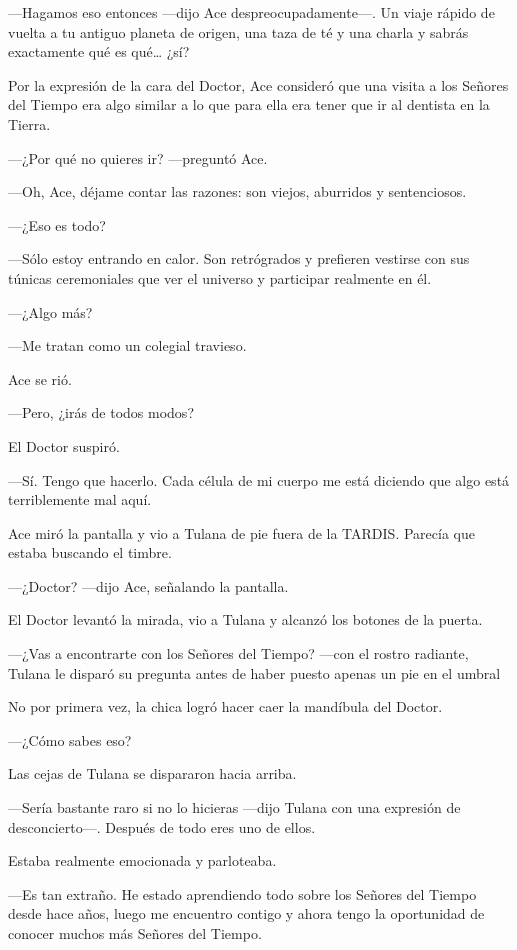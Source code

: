 ---Hagamos eso entonces ---dijo Ace despreocupadamente---. Un
viaje rápido de vuelta a tu antiguo planeta de origen, una taza de té y
una charla y sabrás exactamente qué es qué\ldots{} ¿sí?

Por la expresión de la cara del Doctor, Ace consideró que una
visita a los Señores del Tiempo era algo similar a lo que para ella era
tener que ir al dentista en la Tierra.

---¿Por qué no quieres ir? ---preguntó Ace.

---Oh, Ace, déjame contar las razones: son viejos, aburridos y
sentenciosos.

---¿Eso es todo?

---Sólo estoy entrando en calor. Son retrógrados y prefieren
vestirse con sus túnicas ceremoniales que ver el universo y participar
realmente en él.

---¿Algo más?

---Me tratan como un colegial travieso.

Ace se rió.

---Pero, ¿irás de todos modos?

El Doctor suspiró.

---Sí. Tengo que hacerlo. Cada célula de mi cuerpo me está
diciendo que algo está terriblemente mal aquí.

Ace miró la pantalla y vio a Tulana de pie fuera de la TARDIS.
Parecía que estaba buscando el timbre.

---¿Doctor? ---dijo Ace, señalando la pantalla.

El Doctor levantó la mirada, vio a Tulana y alcanzó los botones
de la puerta.

---¿Vas a encontrarte con los Señores del Tiempo? ---con el
rostro radiante, Tulana le disparó su pregunta antes de haber puesto
apenas un pie en el umbral

No por primera vez, la chica logró hacer caer la mandíbula del
Doctor.

---¿Cómo sabes eso?

Las cejas de Tulana se dispararon hacia arriba.

---Sería bastante raro si no lo hicieras ---dijo Tulana con una
expresión de desconcierto---. Después de todo eres uno de ellos.

Estaba realmente emocionada y parloteaba.

---Es tan extraño. He estado aprendiendo todo sobre los Señores
del Tiempo desde hace años, luego me encuentro contigo y ahora tengo la
oportunidad de conocer muchos más Señores del Tiempo.


